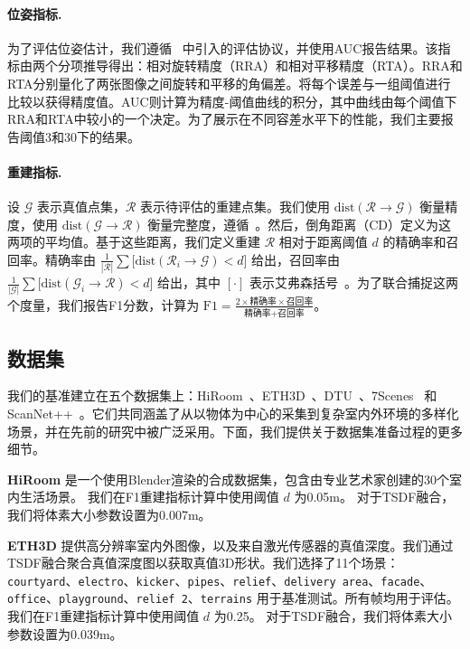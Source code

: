 \paragraph{位姿指标.} 为了评估位姿估计，我们遵循~\cite{wang2025vggt,wang2023posediffusion} 中引入的评估协议，并使用AUC报告结果。该指标由两个分项推导得出：相对旋转精度（RRA）和相对平移精度（RTA）。RRA和RTA分别量化了两张图像之间旋转和平移的角偏差。将每个误差与一组阈值进行比较以获得精度值。AUC则计算为精度-阈值曲线的积分，其中曲线由每个阈值下RRA和RTA中较小的一个决定。为了展示在不同容差水平下的性能，我们主要报告阈值3和30下的结果。

\paragraph{重建指标.}
\label{subsection:appendix:reconstruction_metrics}
设 $\mathcal{G}$ 表示真值点集，$\mathcal{R}$ 表示待评估的重建点集。我们使用 $\text{dist}(\mathcal{R}\rightarrow \mathcal{G})$ 衡量精度，使用 $\text{dist}(\mathcal{G}\rightarrow \mathcal{R})$ 衡量完整度，遵循~\cite{aanaes2016dtu}。然后，倒角距离（CD）定义为这两项的平均值。基于这些距离，我们定义重建 $\mathcal{R}$ 相对于距离阈值 $d$ 的精确率和召回率。精确率由 $\frac{1}{|\mathcal{R}|}\sum \big[\text{dist}(\mathcal{R}_i \rightarrow \mathcal{G}) < d \big]$ 给出，召回率由 $\frac{1}{|\mathcal{G}|}\sum \big[\text{dist}(\mathcal{G}_i \rightarrow \mathcal{R}) < d \big]$ 给出，其中 $\left[\cdot \right]$ 表示艾弗森括号~\cite{knapitsch2017tnt}。为了联合捕捉这两个度量，我们报告F1分数，计算为 $\text{F1} = \frac{2\times \text{精确率}\times \text{召回率}}{\text{精确率}+\text{召回率}}$。

\subsection{数据集}

我们的基准建立在五个数据集上：HiRoom~\citep{SVLightVerse2025}、ETH3D~\citep{schops2017eth3d}、DTU~\citep{aanaes2016dtu}、7Scenes~\citep{shotton2013sevenscene} 和 ScanNet++~\citep{yeshwanth2023scannet++}。它们共同涵盖了从以物体为中心的采集到复杂室内外环境的多样化场景，并在先前的研究中被广泛采用。下面，我们提供关于数据集准备过程的更多细节。

\textbf{HiRoom} 是一个使用Blender渲染的合成数据集，包含由专业艺术家创建的30个室内生活场景。
我们在F1重建指标计算中使用阈值 $d$ 为0.05m。
对于TSDF融合，我们将体素大小参数设置为0.007m。

\textbf{ETH3D} 提供高分辨率室内外图像，以及来自激光传感器的真值深度。我们通过TSDF融合聚合真值深度图以获取真值3D形状。我们选择了11个场景：\texttt{courtyard}、\texttt{electro}、\texttt{kicker}、\texttt{pipes}、\texttt{relief}、\texttt{delivery area}、\texttt{facade}、\texttt{office}、\texttt{playground}、\texttt{relief 2}、\texttt{terrains} 用于基准测试。所有帧均用于评估。
我们在F1重建指标计算中使用阈值 $d$ 为0.25。
对于TSDF融合，我们将体素大小参数设置为0.039m。

